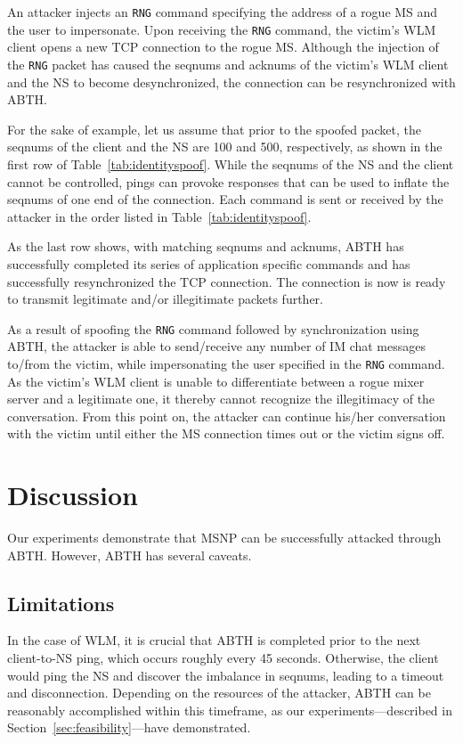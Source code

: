 \documentclass{sig-alternate}
\begin{document}
An attacker injects an \texttt{RNG} command specifying the address of a rogue MS and the user to impersonate.
Upon receiving the \texttt{RNG} command, the victim's WLM client opens a new TCP connection to the rogue MS.
Although the injection of the \texttt{RNG} packet has caused the seqnums and acknums of the victim's WLM client and the NS to become desynchronized, the connection can be resynchronized with ABTH.

For the sake of example, let us assume that prior to the spoofed packet, the seqnums of the client and the NS are 100 and 500, respectively, as shown in the first row of Table~\ref{tab:identityspoof}.
While the seqnums of the NS and the client cannot be controlled, pings can provoke responses that can be used to inflate the seqnums of one end of the connection.
Each command is sent or received by the attacker in the order listed in Table~\ref{tab:identityspoof}.

As the last row shows, with matching seqnums and acknums, ABTH has successfully completed its series of application specific commands and has successfully resynchronized the TCP connection.
The connection is now is ready to transmit legitimate and/or illegitimate packets further.

As a result of spoofing the \texttt{RNG} command followed by synchronization using ABTH, the attacker is able to send/receive any number of IM chat messages to/from the victim, while impersonating the user specified in the \texttt{RNG} command.
As the victim's WLM client is unable to differentiate between a rogue mixer server and a legitimate one, it thereby cannot recognize the illegitimacy of the conversation.
From this point on, the attacker can continue his/her conversation with the victim until either the MS connection times out or the victim signs off.

\section{Discussion}
\label{sec:discussion}

Our experiments demonstrate that MSNP can be successfully attacked through ABTH.
However, ABTH has several caveats.

\subsection{Limitations}

In the case of WLM, it is crucial that ABTH is completed prior to the next client-to-NS ping, which occurs roughly every 45 seconds.
Otherwise, the client would ping the NS and discover the imbalance in seqnums, leading to a timeout and disconnection.
Depending on the resources of the attacker, ABTH can be reasonably accomplished within this timeframe, as our experiments---described in Section~\ref{sec:feasibility}---have demonstrated.
\end{document}
